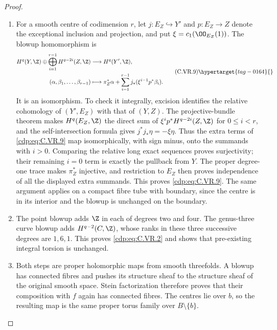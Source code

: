 \begin{proof}
\begin{enumerate}[label=\arabic*.,leftmargin=*]
\item For a smooth centre of codimension $r$, let $j:E_Z\hookrightarrow Y'$
and $p:E_Z\to Z$ denote the exceptional inclusion and projection,
and put $\xi=c_1(\OO_{E_Z}(1))$. The blowup homomorphism is
\[
 \begin{split}
 H^q(Y,\Z)\oplus\bigoplus_{i=1}^{r-1}H^{q-2i}(Z,\Z)
   &\longrightarrow H^q(Y',\Z),\\
 (\alpha,\beta_1,\ldots,\beta_{r-1})
   &\longmapsto \pi_Z^*\alpha+
       \sum_{i=1}^{r-1}j_*(\xi^{i-1}p^*\beta_i).
 \end{split}                                      \tag{C.VR.9}\hypertarget{tag-0164}{}\label{cdp:eq:C.VR.9}
\]
It is an isomorphism. To check it integrally, excision identifies the
relative cohomology of $(Y',E_Z)$ with that of $(Y,Z)$. The
projective-bundle theorem makes $H^q(E_Z,\Z)$ the direct sum of
$\xi^i p^*H^{q-2i}(Z,\Z)$ for $0\le i<r$, and the self-intersection
formula gives $j^*j_*\eta=-\xi\eta$. Thus the extra terms of
\eqref{cdp:eq:C.VR.9} map isomorphically, with sign minus, onto the summands with
$i>0$. Comparing the relative long exact sequences proves
surjectivity; their remaining $i=0$ term is exactly the pullback from
$Y$. The proper degree-one trace makes $\pi_Z^*$ injective, and
restriction to $E_Z$ then proves independence of all the displayed
extra summands. This proves \eqref{cdp:eq:C.VR.9}. The same argument applies on a
compact fibre tube with boundary, since the centre is in its interior
and the blowup is unchanged on the boundary.

\item The point blowup adds $\Z$ in each of degrees two and four. The
genus-three curve blowup adds $H^{q-2}(C,\Z)$, whose ranks in these
three successive degrees are $1,6,1$. This proves \eqref{cdp:eq:C.VR.2} and shows
that pre-existing integral torsion is unchanged.

\item Both steps are proper holomorphic maps from smooth threefolds. A
blowup has connected fibres and pushes its structure sheaf to the
structure sheaf of the original smooth space. Stein factorization
therefore proves that their composition with $f$ again has connected
fibres. The centres lie over $b$, so the resulting map is the same
proper torus family over $B\setminus\{b\}$.


\end{enumerate}
\end{proof}

